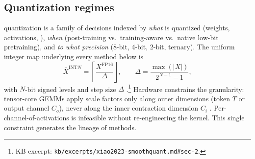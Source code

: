 \subsection{Quantization regimes}
\label{sec:quantization}

 quantization is a family of decisions indexed by \emph{what} is
quantized (weights, activations, ), \emph{when} (post-training
vs.\ training-aware vs.\ native low-bit pretraining), and \emph{to what
precision} (8-bit, 4-bit, 2-bit, ternary). The uniform integer map
underlying every method below is
\begin{equation}
\bar{X}^{\text{INT}N} = \left\lceil \frac{X^{\text{FP16}}}{\Delta} \right\rfloor,
\qquad
\Delta = \frac{\max(|X|)}{2^{N-1} - 1},
\label{eq:uniform-quant}
\end{equation}
with $N$-bit signed levels and step size $\Delta$
\citep[\S 2, Eq.~1]{xiao2023-smoothquant}.\footnote{KB excerpt:
\nolinkurl{kb/excerpts/xiao2023-smoothquant.md#sec-2}.} Hardware
constrains the granularity: tensor-core GEMMs apply scale factors only
along outer dimensions (token $T$ or output channel $C_o$), never along
the inner contraction dimension $C_i$
\citep[\S 3]{xiao2023-smoothquant}. Per-channel-of-activations is
infeasible without re-engineering the kernel. This single constraint
generates the lineage of methods.

